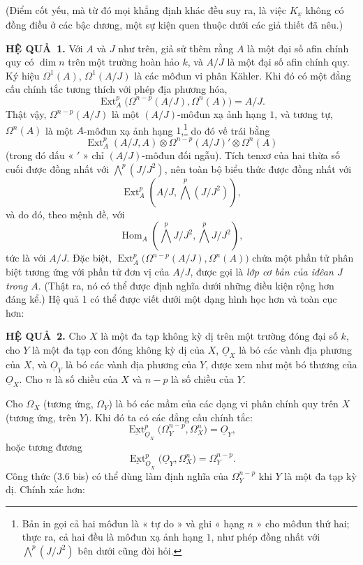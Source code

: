 \documentclass[11pt,twoside,openany]{book}
\numberwithin{equation}{section}
\newcommand{\src}[1]{%
  \phantomsection\hypertarget{src:\fgasourceid:#1}{}%
  \marginpar{\raggedleft\footnotesize\sffamily #1}%
}
\newcommand{\fgasourceid}{unset}
\newcommand{\Osh}{\underline{O}}
\newcommand{\Extsh}{\underline{\operatorname{Ext}}}
\newcommand{\result}[2]{\par\medskip\noindent\textbf{#1\if\relax\detokenize{#2}\relax\else\ #2\fi.}\quad}
\begin{document}
(Điểm cốt yếu, mà từ đó mọi khẳng định khác đều suy ra, là việc
$K_{\underline{x}}$ không có đồng điều ở các bậc dương, một sự kiện quen thuộc dưới các giả thiết đã nêu.)

\result{HỆ QUẢ}{1} Với $A$ và $J$ như trên, giả sử thêm rằng
$A$ là một đại số afin chính quy có $\dim n$ trên một trường hoàn hảo $k$, và
$A/J$ là một đại số afin chính quy. Ký hiệu $\Omega^{1}(A)$,
$\Omega^{1}(A/J)$ là các môđun vi phân Kähler. Khi đó có một
đẳng cấu chính tắc tương thích với phép địa phương hóa,
\begin{equation}\tag{3.5}
  \operatorname{Ext}_{A}^{p}\bigl(\Omega^{n-p}(A/J),\Omega^{n}(A)\bigr)=A/J.
\end{equation}
Thật vậy, $\Omega^{n-p}(A/J)$ là một $(A/J)$-môđun xạ ảnh hạng $1$, và tương tự,
$\Omega^{n}(A)$ là một $A$-môđun xạ ảnh hạng $1$,\footnote{Bản in gọi
cả hai môđun là « tự do » và ghi « hạng $n$ » cho môđun thứ hai; thực ra, cả hai
đều là môđun xạ ảnh hạng $1$, như phép đồng nhất với $\bigwedge^{p}(J/J^{2})$ bên dưới cũng đòi hỏi.}
do đó vế trái bằng
\[
  \operatorname{Ext}_{A}^{p}(A/J,A)
  \otimes\Omega^{n-p}(A/J)'\otimes\Omega^{n}(A)
\]
(trong đó dấu « $'$ » chỉ $(A/J)$-môđun đối ngẫu). Tích tenxơ của
hai thừa số cuối được đồng nhất với $\bigwedge^{p}(J/J^{2})$,
nên toàn bộ biểu thức
được đồng nhất với
\[
  \operatorname{Ext}_{A}^{p}\!\left(A/J,\bigwedge^{p}(J/J^{2})\right),
\]
và do đó, theo mệnh đề, với
\[
  \operatorname{Hom}_{A}\!\left(\bigwedge^{p}J/J^{2},
  \bigwedge^{p}J/J^{2}\right),
\]
tức là với $A/J$. Đặc biệt,
$\operatorname{Ext}_{A}^{p}\bigl(\Omega^{n-p}(A/J),\Omega^{n}(A)\bigr)$ chứa
một phần tử phân biệt tương ứng với phần tử đơn vị của $A/J$, được gọi là
\emph{lớp cơ bản của iđêan $J$ trong $A$}. (Thật ra, nó có thể được
định nghĩa dưới những điều kiện rộng hơn đáng kể.) Hệ quả 1 có thể được viết
dưới một dạng hình học hơn và toàn cục hơn:

\result{HỆ QUẢ}{2} Cho $X$ là một đa tạp không kỳ dị trên một trường đóng
đại số $k$, cho $Y$ là một đa tạp con đóng không kỳ dị của $X$,
$\Osh_X$ là bó các vành địa phương của $X$, và $\Osh_Y$ là bó các vành
địa phương của $Y$, được xem như một bó thương của $\Osh_X$. Cho $n$ là
số chiều của $X$ và $n-p$ là số chiều của $Y$.

\src{176}
Cho $\Omega_X$ (tương ứng, $\Omega_Y$) là bó các mầm của các dạng
vi phân chính quy trên $X$ (tương ứng, trên $Y$). Khi đó ta có các đẳng cấu
chính tắc:
\begin{equation}\tag{3.6}
  \Extsh_{\Osh_X}^{p}\bigl(\Omega_Y^{n-p},\Omega_X^{n}\bigr)=\Osh_Y,
\end{equation}
hoặc tương đương
\begin{equation}\tag{3.6 bis}
  \Extsh_{\Osh_X}^{p}\bigl(\Osh_Y,\Omega_X^{n}\bigr)=\Omega_Y^{n-p}.
\end{equation}
Công thức (3.6 bis) có thể dùng làm định nghĩa của $\Omega_Y^{n-p}$ khi $Y$
là một đa tạp kỳ dị. Chính xác hơn:
\end{document}
